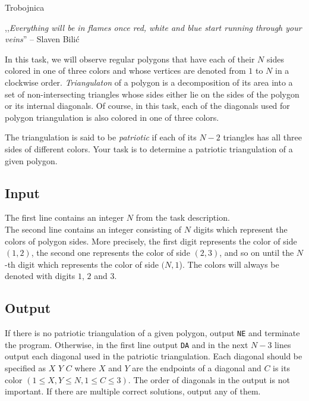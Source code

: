 \begin{statement}[
  problempoints=110,
  timelimit=1 sekunda,
  memorylimit=512 MiB,
]{Trobojnica}



,,\textit{Everything will be in flames once red, white and blue start running through your veins}''
-- Slaven Bilić

In this task, we will observe regular polygons that have each of their $N$ sides
colored in one of three colors and whose vertices are denoted from $1$ to $N$
in a clockwise order. \textit{Triangulaton} of a polygon is a decomposition of
its area into a set of non-intersecting triangles whose sides either lie on the
sides of the polygon or its internal diagonals. Of course, in this task, each of
the diagonals used for polygon triangulation is also colored in one of three
colors.

The triangulation is said to be \textit{patriotic} if each of its $N-2$
triangles has all three sides of different colors. Your task is to determine
a patriotic triangulation of a given polygon.

\subsection*{Input}
The first line contains an integer $N$ from the task description. \\
The second line contains an integer consisting of $N$ digits which represent
the colors of polygon sides. More precisely, the first digit represents
the color of side $(1,2)$, the second one represents the color of side $(2,3)$,
and so on until the $N$-th digit which represents the color of side $(N,1$). The
colors will always be denoted with digits $1$, $2$ and $3$.

\subsection*{Output}
If there is no patriotic triangulation of a given polygon, output \texttt{NE}
and terminate the program. Otherwise, in the first line output \texttt{DA}
and in the next $N-3$ lines output each diagonal used in the patriotic
triangulation. Each diagonal should be specified as $X$ $Y$ $C$ where $X$ and
$Y$ are the endpoints of a diagonal and $C$ is its color
$(1 \le X, Y \le N, 1 \le C \le 3)$. The order of diagonals in the output is
not important. If there are multiple correct solutions, output any of them.


\end{statement}
